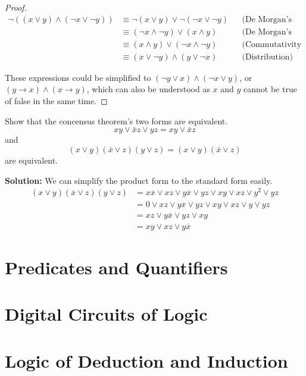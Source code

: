 \begin{proof}
                        \begin{align*}
                            \neg((x \lor y) \land (\neg x \lor \neg y)) & \equiv \neg(x \lor y) \lor \neg(\neg x \lor \neg y) && \text{(De Morgan's laws)} \\
                            & \equiv (\neg x \land \neg y) \lor (x \land y) && \text{(De Morgan's laws)} \\
                            & \equiv (x \land y) \lor (\neg x \land \neg y) && \text{(Commutativity of OR)} \\
                            & \equiv (x \lor \neg y) \land (y \lor \neg x) && \text{(Distribution)}
                            \end{align*}
                            

            These expressions could be simplified to $(\lnot y \lor x)\land(\lnot x\lor y)$, or
            $(y\rightarrow x)\land(x\rightarrow y)$, which can also be understood as $x$ and $y$
            cannot be true of false in the same time.
        \end{proof}

        \begin{exercise}
            Show that the concensus theorem's two forms are equivalent.
                $$xy\lor\bar{x}z\lor yz=xy\lor\bar{x}z$$
            and
                $$(x\lor y)(\bar{x}\lor z)(y\lor z)=(x\lor y)(\bar{x}\lor z)$$
            are equivalent.
        \end{exercise}
        \textbf{Solution:}
        We can simplify the product form to the standard form easily.
        \begin{align*}
            (x \lor y)(\overline{x} \lor z)(y \lor z) &= x\overline{x} \lor xz \lor y\overline{x} \lor yz \lor xy \lor xz \lor y^2 \lor yz \\
            &= 0 \lor xz \lor y\overline{x} \lor yz \lor xy \lor xz \lor y \lor yz \\
            &= xz \lor y\overline{x} \lor yz \lor xy \\
            &= xy \lor xz \lor y\overline{x}
        \end{align*}

    \section{Predicates and Quantifiers}

    \section{Digital Circuits of Logic}

    \section{Logic of Deduction and Induction}
